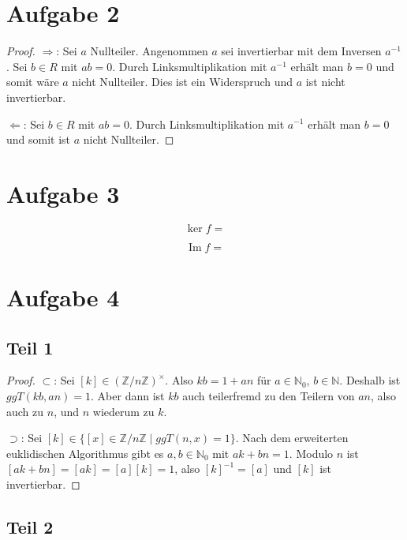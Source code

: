 \documentclass[10pt,a4paper]{article}
\DeclareMathOperator{\im}{Im}
\begin{document}
\section{Aufgabe 2}

\begin{proof}
  $\Rightarrow$: Sei $a$ Nullteiler.
  Angenommen $a$ sei invertierbar mit dem Inversen $a^{-1}$.
  Sei $b \in R$ mit $ab = 0$.
  Durch Linksmultiplikation mit $a^{-1}$ erhält man $b = 0$ und somit wäre $a$ nicht Nullteiler.
  Dies ist ein Widerspruch und $a$ ist nicht invertierbar.

  $\Leftarrow$: Sei $b \in R$ mit $ab = 0$.
  Durch Linksmultiplikation mit $a^{-1}$ erhält man $b = 0$ und somit ist $a$ nicht Nullteiler.
\end{proof}

\section{Aufgabe 3}

\begin{equation}
  \ker f =
\end{equation}

\begin{equation}
  \im f =
\end{equation}

\section{Aufgabe 4}

\subsection{Teil 1}

\begin{proof}
  $\subset$: Sei $[k] \in (\mathbb{Z} / n \mathbb{Z})^{\times}$.
  Also $kb = 1 + an$ für $a \in \mathbb{N}_{0}$, $b \in \mathbb{N}$.
  Deshalb ist $ggT(kb, an) = 1$.
  Aber dann ist $kb$ auch teilerfremd zu den Teilern von $an$, also auch zu $n$, und $n$ wiederum zu $k$.

  $\supset$: Sei $[k] \in \{ [x] \in \mathbb{Z} / n \mathbb{Z} \mid ggT(n, x) = 1 \}$.
  Nach dem erweiterten euklidischen Algorithmus gibt es $a, b \in \mathbb{N}_{0}$ mit $ak + bn = 1$.
  Modulo $n$ ist $[ak + bn] = [ak] = [a][k] = 1$, also $[k]^{-1} = [a]$ und $[k]$ ist invertierbar.
\end{proof}

\subsection{Teil 2}
\end{document}
